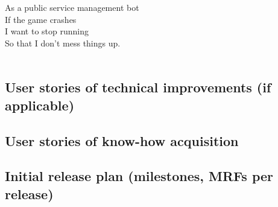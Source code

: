 As a public service management bot\\
If the game crashes\\
I want to stop running\\
So that I don't mess things up.\\
\\

\subsection{User stories of technical improvements (if applicable)}
\subsection{User stories of know-how acquisition}
\subsection{Initial release plan (milestones, MRFs per release)}

\newpage
